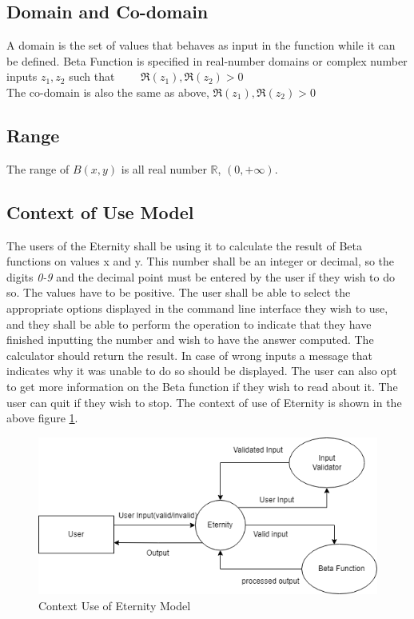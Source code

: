 \documentclass[letterpaper, 11pt]{article}
\begin{document}
    \subsection{Domain and Co-domain}
         \normalsize{
         A domain is the set of values that behaves as input in the function while it can be defined. Beta Function is specified in real-number domains or complex number inputs $z_{1},z_{2}$  such that ${\qquad \Re (z_{1}),\Re (z_{2})>0\ }$ \\
         The co-domain is also the same as above, ${\Re (z_{1}),\Re (z_{2})>0\ }$
         }\cite{collegedunia}\cite{wiki}
    \subsection{Range}\cite{wiki}
        \normalsize{ The range of $B(x,y)$ is all real number $\mathbb{R}$, $(0, + \infty)$. }
\pagebreak
    \subsection{Context of Use Model}
        \normalsize{The users of the Eternity shall be using it to calculate the result of Beta functions on values x and y. This number shall be an integer or decimal, so the digits \textit{0-9} and the decimal point must be entered by the user if they wish to do so. The values have to be positive. The user shall be able to select the appropriate options displayed in the command line interface they wish to use, and they shall be able to perform the operation to indicate that they have finished inputting the number and wish to have the answer computed. The calculator should return the result. In case of wrong inputs a message that indicates why it was unable to do so should be displayed. The user can also opt to get more information on the Beta function if they wish to read about it. The user can quit if they wish to stop. The context of use of Eternity is shown in the above figure \ref{fig:context}}.
        
        \begin{figure}[htb]
            \begin{center}
                  \includegraphics[width= 15cm]{images/context_diagram.png}
            \end{center}
             \caption{ Context Use of Eternity Model}
            \label{fig:context}
        \end{figure}
        
\end{document}
